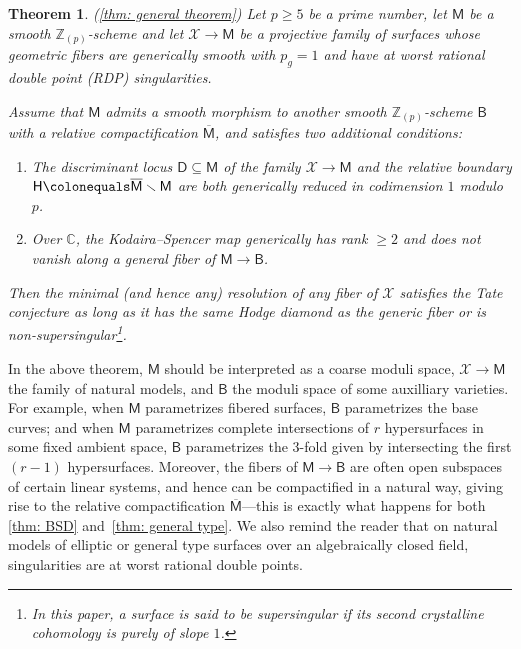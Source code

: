 \documentclass[11pt, letterpaper]{amsart}
\theoremstyle{plain}
\newtheorem{theorem}{Theorem}[section]
\theoremstyle{definition}
\newcommand{\IC}{\mathbb{C}}
\newcommand{\IZ}{\mathbb{Z}}
\newcommand{\<}{\langle}
\renewcommand{\>}{\rangle}
\newcommand{\sfD}{\mathsf{D}}
\newcommand{\sfM}{\mathsf{M}}
\newcommand{\sX}{\mathcal{X}}
\newcommand{\sfH}{\mathsf{H}}
\newcommand{\sfB}{\mathsf{B}}
\begin{document}
\begin{theorem}
\emph{(\cref{thm: general theorem})}
\label{intro_main_thm}
    Let $p\geq 5$ be a prime number, let $\sfM$ be a smooth $\IZ_{(p)}$-scheme and let $\sX \to \sfM$ be a projective family of surfaces whose geometric fibers are generically smooth with $p_g = 1$ and have at worst rational double point (RDP) singularities. 
    
    Assume that $\sfM$ admits a smooth morphism to another smooth $\IZ_{(p)}$-scheme $\sfB$ with a relative compactification $\overline{\sfM}$, and satisfies two additional conditions: 
    \begin{enumerate}[label=\upshape{(\roman*)}]
        \item The discriminant locus $\sfD\subseteq \sfM$ of the family $\sX\to \sfM$ and the relative boundary $\sfH \colonequals \overline{\sfM} \smallsetminus \sfM$ are both generically reduced in codimension $1$ modulo $p$.
        \item Over $\IC$, the Kodaira--Spencer map generically has rank $\ge 2$ and does not vanish along a general fiber of $\sfM \to \sfB$. 
    \end{enumerate}
    Then the minimal (and hence any) resolution of any fiber of $\sX$ satisfies the Tate conjecture as long as it has the same Hodge diamond as the generic fiber or is non-supersingular\footnote{In this paper, a surface is said to be \textit{supersingular} if its second crystalline cohomology is purely of slope $1$.}. 
\end{theorem}

In the above theorem, $\sfM$ should be interpreted as a coarse moduli space, $\sX\to \sfM$ the family of natural models, and $\sfB$ the moduli space of some auxilliary varieties. 
For example, when $\sfM$ parametrizes fibered surfaces, $\sfB$ parametrizes the base curves; and when $\sfM$ parametrizes complete intersections of $r$ hypersurfaces in some fixed ambient space, $\sfB$ parametrizes the $3$-fold given by intersecting the first $(r - 1)$ hypersurfaces. 
Moreover, the fibers of $\sfM \to \sfB$ are often open subspaces of certain linear systems, and hence can be compactified in a natural way, giving rise to the relative compactification $\overline{\sfM}$---this is exactly what happens for both \cref{thm: BSD} and~\ref{thm: general type}. We also remind the reader that on natural models of elliptic or general type surfaces over an algebraically closed field, singularities are at worst rational double points. 
\end{document}
